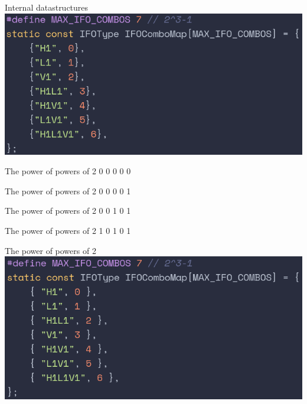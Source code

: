\documentclass{beamer}
\begin{document}
\begin{frame}{Internal datastructures}
    \centering
    \includegraphics[width=\textwidth]{old-icombo.png}
\end{frame}

\begin{frame}{The power of powers of 2}
    \centering
    \huge{0 0 0 0 0}
\end{frame}

\begin{frame}{The power of powers of 2}
    \centering
    \huge{0 0 0 0 1}
\end{frame}

\begin{frame}{The power of powers of 2}
    \centering
    \huge{0 0 1 0 1}
\end{frame}

\begin{frame}{The power of powers of 2}
    \centering
    \huge{1 0 1 0 1}
\end{frame}

\begin{frame}{The power of powers of 2}
    \centering
    \includegraphics[width=\textwidth]{new-icombo.png}
\end{frame}
\end{document}
